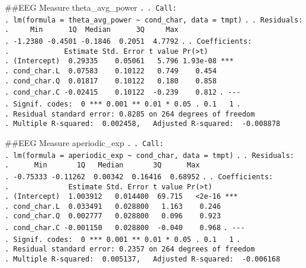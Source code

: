 \documentclass[
]{article}
\begin{document}
\#\#EEG Measure theta\_avg\_power \texttt{.} \texttt{.\ Call:}
\texttt{.\ lm(formula\ =\ theta\_avg\_power\ \textasciitilde{}\ cond\_char,\ data\ =\ tmpt)}
\texttt{.} \texttt{.\ Residuals:}
\texttt{.\ \ \ \ \ Min\ \ \ \ \ \ 1Q\ \ Median\ \ \ \ \ \ 3Q\ \ \ \ \ Max}
\texttt{.\ -1.2380\ -0.4501\ -0.1846\ \ 0.2051\ \ 4.7792} \texttt{.}
\texttt{.\ Coefficients:}
\texttt{.\ \ \ \ \ \ \ \ \ \ \ \ \ Estimate\ Std.\ Error\ t\ value\ Pr(\textgreater{}\textbar{}t\textbar{})}
\texttt{.\ (Intercept)\ \ 0.29335\ \ \ \ 0.05061\ \ \ 5.796\ 1.93e-08\ ***}
\texttt{.\ cond\_char.L\ \ 0.07583\ \ \ \ 0.10122\ \ \ 0.749\ \ \ \ 0.454}
\texttt{.\ cond\_char.Q\ \ 0.01817\ \ \ \ 0.10122\ \ \ 0.180\ \ \ \ 0.858}
\texttt{.\ cond\_char.C\ -0.02415\ \ \ \ 0.10122\ \ -0.239\ \ \ \ 0.812}
\texttt{.\ -\/-\/-}
\texttt{.\ Signif.\ codes:\ \ 0\ \textquotesingle{}***\textquotesingle{}\ 0.001\ \textquotesingle{}**\textquotesingle{}\ 0.01\ \textquotesingle{}*\textquotesingle{}\ 0.05\ \textquotesingle{}.\textquotesingle{}\ 0.1\ \textquotesingle{}\ \textquotesingle{}\ 1}
\texttt{.}
\texttt{.\ Residual\ standard\ error:\ 0.8285\ on\ 264\ degrees\ of\ freedom}
\texttt{.\ Multiple\ R-squared:\ \ 0.002458,\ \ \ Adjusted\ R-squared:\ \ -0.008878}

\#\#EEG Measure aperiodic\_exp \texttt{.} \texttt{.\ Call:}
\texttt{.\ lm(formula\ =\ aperiodic\_exp\ \textasciitilde{}\ cond\_char,\ data\ =\ tmpt)}
\texttt{.} \texttt{.\ Residuals:}
\texttt{.\ \ \ \ \ \ Min\ \ \ \ \ \ \ 1Q\ \ \ Median\ \ \ \ \ \ \ 3Q\ \ \ \ \ \ Max}
\texttt{.\ -0.75333\ -0.11262\ \ 0.00342\ \ 0.16416\ \ 0.68952}
\texttt{.} \texttt{.\ Coefficients:}
\texttt{.\ \ \ \ \ \ \ \ \ \ \ \ \ \ Estimate\ Std.\ Error\ t\ value\ Pr(\textgreater{}\textbar{}t\textbar{})}
\texttt{.\ (Intercept)\ \ 1.003912\ \ \ 0.014400\ \ 69.715\ \ \ \textless{}2e-16\ ***}
\texttt{.\ cond\_char.L\ \ 0.033491\ \ \ 0.028800\ \ \ 1.163\ \ \ \ 0.246}
\texttt{.\ cond\_char.Q\ \ 0.002777\ \ \ 0.028800\ \ \ 0.096\ \ \ \ 0.923}
\texttt{.\ cond\_char.C\ -0.001150\ \ \ 0.028800\ \ -0.040\ \ \ \ 0.968}
\texttt{.\ -\/-\/-}
\texttt{.\ Signif.\ codes:\ \ 0\ \textquotesingle{}***\textquotesingle{}\ 0.001\ \textquotesingle{}**\textquotesingle{}\ 0.01\ \textquotesingle{}*\textquotesingle{}\ 0.05\ \textquotesingle{}.\textquotesingle{}\ 0.1\ \textquotesingle{}\ \textquotesingle{}\ 1}
\texttt{.}
\texttt{.\ Residual\ standard\ error:\ 0.2357\ on\ 264\ degrees\ of\ freedom}
\texttt{.\ Multiple\ R-squared:\ \ 0.005137,\ \ \ Adjusted\ R-squared:\ \ -0.006168}
\end{document}
